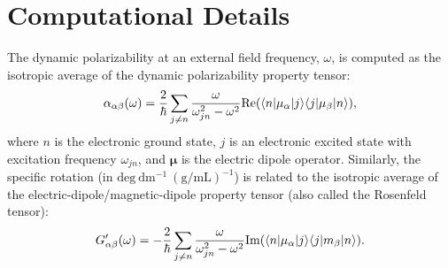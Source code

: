 \section{Computational Details} \label{se:compp1}
The dynamic polarizability at an external field frequency, $\omega$, is computed as the isotropic average of the dynamic polarizability property tensor:\cite{Barron2004,Crawford2006}
    \begin{equation} \label{eq:alpha}
        \alpha_{\alpha\beta}(\omega) = \frac{2}{\hbar}\sum_{j\neq n}\frac{\omega}{\omega_{jn}^2-\omega^2}\textrm{Re}(\langle n |\mu_\alpha| j \rangle\langle j |\mu_\beta| n \rangle),
    \end{equation}
    where $n$ is the electronic ground state, $j$ is an electronic excited state with excitation frequency $\omega_{jn}$, and $\boldsymbol{\mu}$ is the electric dipole operator.  
    Similarly, the specific rotation (in $\mathrm{deg\ dm^{-1}\ (g/mL)^{-1}}$) is related to the isotropic average of the electric-dipole/magnetic-dipole property tensor (also called the Rosenfeld tensor):\cite{Rosenfeld1929a}
    \begin{equation} \label{eq:G'}
        G'_{\alpha\beta}(\omega)=-\frac{2}{\hbar}\sum_{j\neq n}\frac{\omega}{\omega_{jn}^2-\omega^2}\textrm{Im}(\langle n |\mu_\alpha| j \rangle\langle j |m_\beta| n \rangle).
    \end{equation}

    
